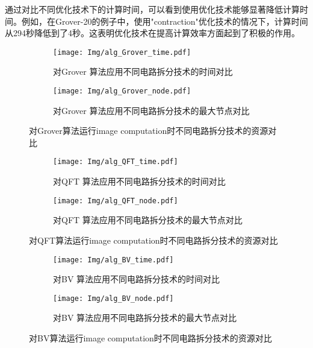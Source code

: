 通过对比不同优化技术下的计算时间，可以看到使用优化技术能够显著降低计算时间。例如，在Grover-20的例子中，使用"contraction"优化技术的情况下，计算时间从294秒降低到了4秒。这表明优化技术在提高计算效率方面起到了积极的作用。
\begin{figure}[!htbp]
    \centering
    \begin{subfigure}[b]{.4\textwidth}
        \centering
        \texttt{[image: Img/alg\_Grover\_time.pdf]}
        \caption{对Grover 算法应用不同电路拆分技术的时间对比}
        \label{fig:grover-time}
    \end{subfigure}
    \qquad
    \begin{subfigure}[b]{.4\textwidth}
        \centering
        \texttt{[image: Img/alg\_Grover\_node.pdf]}
        \caption{对Grover 算法应用不同电路拆分技术的最大节点对比}
        \label{fig:grover-node}
    \end{subfigure}
    
    \caption{对Grover算法运行image computation时不同电路拆分技术的资源对比}
    \label{fig:grover-compare}
\end{figure}
\begin{figure}[!htbp]
    \centering
    \begin{subfigure}[b]{.4\textwidth}
        \centering
        \texttt{[image: Img/alg\_QFT\_time.pdf]}
        \caption{对QFT 算法应用不同电路拆分技术的时间对比}
        \label{fig:QFT-time}
    \end{subfigure}
    \qquad
    \begin{subfigure}[b]{.4\textwidth}
        \centering
        \texttt{[image: Img/alg\_QFT\_node.pdf]}
        \caption{对QFT 算法应用不同电路拆分技术的最大节点对比}
        \label{fig:QFT-node}
    \end{subfigure}
    \caption{对QFT算法运行image computation时不同电路拆分技术的资源对比}
    \label{fig:QFT-compare}
\end{figure}
\begin{figure}[!htbp]
    \centering
    \begin{subfigure}[b]{.4\textwidth}
        \centering
        \texttt{[image: Img/alg\_BV\_time.pdf]}
        \caption{对BV 算法应用不同电路拆分技术的时间对比}
        \label{fig:BV-time}
    \end{subfigure}
    \qquad
    \begin{subfigure}[b]{.4\textwidth}
        \centering
        \texttt{[image: Img/alg\_BV\_node.pdf]}
        \caption{对BV 算法应用不同电路拆分技术的最大节点对比}
        \label{fig:BV-node}
    \end{subfigure}
    \caption{对BV算法运行image computation时不同电路拆分技术的资源对比}
    \label{fig:BV-compare}
\end{figure}
